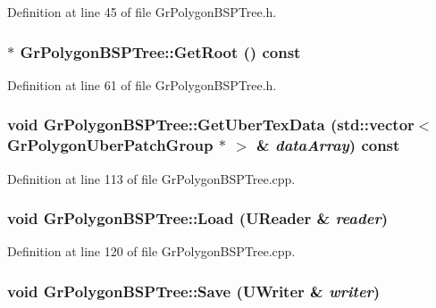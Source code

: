 Definition at line 45 of file GrPolygonBSPTree.h.\hypertarget{class_gr_polygon_b_s_p_tree_8bc067621d02d771088344934dfa134f}{
\subsubsection[{GetRoot}]{$\ast$ GrPolygonBSPTree::GetRoot () const}}
\label{class_gr_polygon_b_s_p_tree_8bc067621d02d771088344934dfa134f}




Definition at line 61 of file GrPolygonBSPTree.h.\hypertarget{class_gr_polygon_b_s_p_tree_d184f56f8369b3428e407dc5e38dc768}{
\subsubsection[{GetUberTexData}]{\setlength{\rightskip}{0pt plus 5cm}void GrPolygonBSPTree::GetUberTexData (std::vector$<$ {\bf GrPolygonUberPatchGroup} $\ast$ $>$ \& {\em dataArray}) const}}
\label{class_gr_polygon_b_s_p_tree_d184f56f8369b3428e407dc5e38dc768}




Definition at line 113 of file GrPolygonBSPTree.cpp.\hypertarget{class_gr_polygon_b_s_p_tree_37da90c4a80a5f8889b9754024a3307f}{
\subsubsection[{Load}]{\setlength{\rightskip}{0pt plus 5cm}void GrPolygonBSPTree::Load ({\bf UReader} \& {\em reader})}}
\label{class_gr_polygon_b_s_p_tree_37da90c4a80a5f8889b9754024a3307f}




Definition at line 120 of file GrPolygonBSPTree.cpp.\hypertarget{class_gr_polygon_b_s_p_tree_a819e2036225a94ce82987e8f34b160f}{
\subsubsection[{Save}]{\setlength{\rightskip}{0pt plus 5cm}void GrPolygonBSPTree::Save ({\bf UWriter} \& {\em writer})}}
\label{class_gr_polygon_b_s_p_tree_a819e2036225a94ce82987e8f34b160f}




